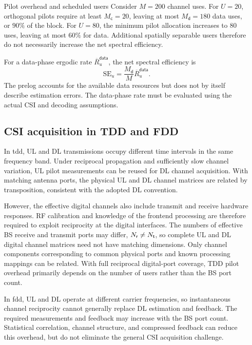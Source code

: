 \begin{example}{Pilot overhead and scheduled users}
	Consider $M=200$ channel uses. For $U=20$, orthogonal pilots require at least $M_{\mathsf c}=20$, leaving at most $M_{\mathsf d}=180$ data uses, or $90\%$ of the block. For $U=80$, the minimum pilot allocation increases to $80$ uses, leaving at most $60\%$ for data. Additional spatially separable users therefore do not necessarily increase the net spectral efficiency.
\end{example}

For a data-phase ergodic rate $\overline R_u^{\mathsf{data}}$, the net spectral efficiency is
\begin{equation}
	\mathrm{SE}_u
	=\frac{M_{\mathsf d}}{M}\overline R_u^{\mathsf{data}}.
	\label{eq:prelog-05}
\end{equation}
The prelog accounts for the available data resources but does not by itself describe estimation errors. The data-phase rate must be evaluated using the actual CSI and decoding assumptions.

\subsection{CSI acquisition in TDD and FDD}
In \ac{tdd}, UL and DL transmissions occupy different time intervals in the same frequency band. Under reciprocal propagation and sufficiently slow channel variation, UL pilot measurements can be reused for DL channel acquisition. With matching antenna ports, the physical UL and DL channel matrices are related by transposition, consistent with the adopted DL convention.

However, the effective digital channels also include transmit and receive hardware responses. RF calibration and knowledge of the frontend processing are therefore required to exploit reciprocity at the digital interfaces. The numbers of effective BS receive and transmit ports may differ, $N_{\mathsf{r}}\ne N_{\mathsf{t}}$, so complete UL and DL digital channel matrices need not have matching dimensions. Only channel components corresponding to common physical ports and known processing mappings can be related. With full reciprocal digital-port coverage, TDD pilot overhead primarily depends on the number of users rather than the BS port count.

In \ac{fdd}, UL and DL operate at different carrier frequencies, so instantaneous channel reciprocity cannot generally replace DL estimation and feedback. The required measurements and feedback may increase with the BS port count. Statistical correlation, channel structure, and compressed feedback can reduce this overhead, but do not eliminate the general CSI acquisition challenge.

